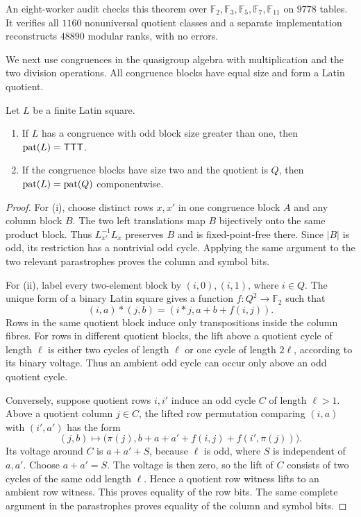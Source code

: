 An eight-worker audit checks this theorem over
$\mathbb F_2,\mathbb F_3,\mathbb F_5,\mathbb F_7,\mathbb F_{11}$ on $9778$
tables.  It verifies all $1160$ nonuniversal quotient classes and a separate
implementation reconstructs $48890$ modular ranks, with no errors.

We next use congruences in the quasigroup algebra with multiplication and the
two division operations.  All congruence blocks have equal size and form a
Latin quotient.

\begin{theorem}\label{thm:congruence-obstructions}
Let $L$ be a finite Latin square.
\begin{enumerate}[label=(\roman*)]
\item If $L$ has a congruence with odd block size greater than one, then
  $\operatorname{pat}(L)=\mathsf{TTT}$.
\item If the congruence blocks have size two and the quotient is $Q$, then
  $\operatorname{pat}(L)=\operatorname{pat}(Q)$ componentwise.
\end{enumerate}
\end{theorem}

\begin{proof}
For (i), choose distinct rows $x,x'$ in one congruence block $A$ and any
column block $B$.  The two left translations map $B$ bijectively onto the
same product block.  Thus $L_{x'}^{-1}L_x$ preserves $B$ and is
fixed-point-free there.  Since $|B|$ is odd, its restriction has a
nontrivial odd cycle.  Applying the same argument to the two relevant
parastrophes proves the column and symbol bits.

For (ii), label every two-element block by $(i,0),(i,1)$, where $i\in Q$.
The unique form of a binary Latin square gives a function
$f\colon Q^2\to\mathbb F_2$ such that
\[
  (i,a)*(j,b)=(i*j,a+b+f(i,j)).
\]
Rows in the same quotient block induce only transpositions inside the column
fibres.  For rows in different quotient blocks, the lift above a quotient
cycle of length $\ell$ is either two cycles of length $\ell$ or one cycle of
length $2\ell$, according to its binary voltage.  Thus an ambient odd cycle
can occur only above an odd quotient cycle.

Conversely, suppose quotient rows $i,i'$ induce an odd cycle $C$ of length
$\ell>1$.
Above a quotient column $j\in C$, the lifted row permutation comparing
$(i,a)$ with $(i',a')$ has the form
\[
 (j,b)\longmapsto
 \bigl(\pi(j),b+a+a'+f(i,j)+f(i',\pi(j))\bigr).
\]
Its voltage around $C$ is $a+a'+S$, because $\ell$ is odd, where $S$ is
independent of $a,a'$.  Choose $a+a'=S$.  The voltage is then zero, so the
lift of $C$ consists of two cycles of the same odd length $\ell$.  Hence a
quotient row witness lifts to an ambient row witness.  This proves equality
of the row bits.  The same complete argument in the parastrophes proves
equality of the column and symbol bits.
\end{proof}


